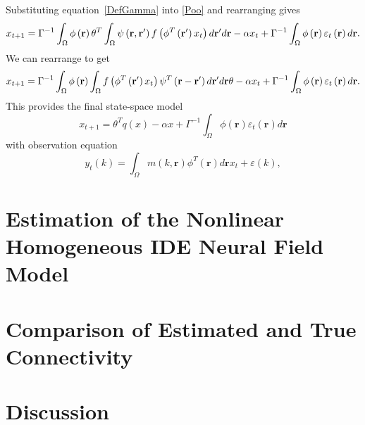 \documentclass[onecolumn,draftcls]{IEEEtran}
\begin{document}
Substituting equation~\ref{DefGamma} into \ref{Poo} and rearranging gives
\begin{equation}\label{SS Model}
{x_{t+1}} = {\Gamma ^{ - 1}}\int_\Omega  {\phi \left( {\bf{r}} \right)\theta^T\int_\Omega  {\psi \left( {{\bf{r}} , {\bf{r'}}} \right)f\left( {{\phi ^T}\left( {{\bf{r'}}} \right){x_t}} \right)d{\bf{r'}}} d{\bf{r}}}-\alpha x_t + {\Gamma ^{ - 1}}\int_\Omega  {\phi \left( {\bf{r}} \right){\varepsilon _t}\left( {\bf{r}} \right)d{\bf{r}}}.
\end{equation}
We can rearrange to get
\begin{equation}\label{Homogeneous SS Model}
{x_{t+1}} = {\Gamma ^{ - 1}}\int_\Omega  {\phi \left( {\bf{r}} \right)\int_\Omega  {f\left( {{\phi ^T}\left( {{\bf{r'}}} \right){x_t}} \right)\psi^T \left( {{\bf{r}} - {\bf{r'}}} \right)d{\bf{r'}}} d{\bf{r}}}\theta - \alpha x_t + {\Gamma ^{ - 1}}\int_\Omega  {\phi \left( {\bf{r}} \right){\varepsilon _t}\left( {\bf{r}} \right)d{\bf{r}}}.
\end{equation}
This provides the final state-space model
\begin{equation}\label{AbbrevSSModel}
x_{t + 1} = \theta^T q(x) -\alpha x + \Gamma ^{ - 1}\int_\Omega  {\phi ( \mathbf{r} ){\varepsilon _t}( \mathbf{r} )d\mathbf{r}}
\end{equation}
with observation equation
\begin{equation}\label{ObservationEquation}
    y_t( k ) = \int_\Omega  m( k,\mathbf{r} )\phi^T( \mathbf{r} ) d\mathbf{r}x_t  + \varepsilon ( k ),
\end{equation}

\section{Estimation of the Nonlinear Homogeneous IDE Neural Field Model}


\section{Comparison of Estimated and True Connectivity}

\section{Discussion}
\end{document}
